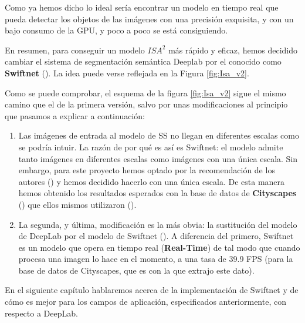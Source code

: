 Como ya hemos dicho lo ideal sería encontrar un modelo en tiempo real que pueda detectar los objetos de las imágenes con una precisión exquisita, y con un bajo consumo de la \ac{GPU}, y poco a poco se está consiguiendo.


En resumen, para conseguir un modelo $ISA^{2}$ más rápido y eficaz, hemos decidido cambiar el sistema de segmentación semántica Deeplab por el conocido como \textbf{Swiftnet} (\cite{swiftnet}). La idea puede verse reflejada en la Figura \ref{fig:Isa_v2}.



Como se puede comprobar, el esquema de la figura \ref{fig:Isa_v2} sigue el mismo camino que el de la primera versión, salvo por unas modificaciones al principio que pasamos a explicar a continuación:

\begin{enumerate}

\item Las imágenes de entrada al modelo de \ac{SS} no llegan en diferentes escalas como se podría intuir. La razón de por qué es así es Swiftnet: el modelo admite tanto imágenes en diferentes escalas como imágenes con una única escala. Sin embargo, para este proyecto hemos optado por la recomendación de los autores (\cite{github_swiftnet}) y hemos decidido hacerlo con una única escala. De esta manera hemos obtenido los resultados esperados con la base de datos de \textbf{Cityscapes} (\cite{cityscapes}) que ellos mismos utilizaron (\cite{swiftnet}).

\item La segunda, y última, modificación es la más obvia: la sustitución del modelo de DeepLab por el modelo de Swiftnet (\cite{swiftnet}). A diferencia del primero, Swiftnet es un modelo que opera en tiempo real (\textbf{Real-Time}) de tal modo que cuando procesa una imagen lo hace en el momento, a una tasa de 39.9 \ac{FPS} (para la base de datos de Cityscapes, que es con la que extrajo este dato).%

\end{enumerate}


En el siguiente capítulo hablaremos acerca de la implementación de Swiftnet y de cómo es mejor para los campos de aplicación, especificados anteriormente, con respecto a DeepLab.
